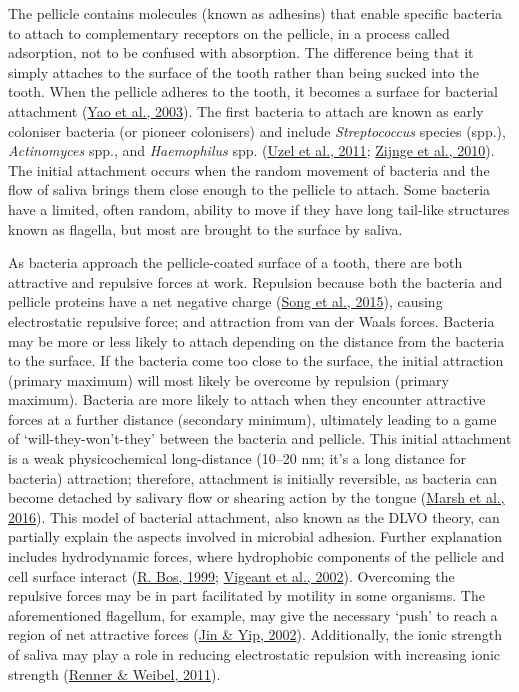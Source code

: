 \documentclass[
  letterpaper,
]{book}
\begin{document}
The pellicle contains molecules (known as adhesins) that enable specific
bacteria to attach to complementary receptors on the pellicle, in a
process called adsorption, not to be confused with absorption. The
difference being that it simply attaches to the surface of the tooth
rather than being sucked into the tooth. When the pellicle adheres to
the tooth, it becomes a surface for bacterial attachment
(\protect\hyperlink{ref-yaoIdentificationProtein2003}{Yao et al.,
2003}). The first bacteria to attach are known as early coloniser
bacteria (or pioneer colonisers) and include \emph{Streptococcus}
species (spp.), \emph{Actinomyces} spp., and \emph{Haemophilus} spp.
(\protect\hyperlink{ref-uzelMicrobialShifts2011}{Uzel et al., 2011};
\protect\hyperlink{ref-zijngeBiofilmArchitecture2010}{Zijnge et al.,
2010}). The initial attachment occurs when the random movement of
bacteria and the flow of saliva brings them close enough to the pellicle
to attach. Some bacteria have a limited, often random, ability to move
if they have long tail-like structures known as flagella, but most are
brought to the surface by saliva.

As bacteria approach the pellicle-coated surface of a tooth, there are
both attractive and repulsive forces at work. Repulsion because both the
bacteria and pellicle proteins have a net negative charge
(\protect\hyperlink{ref-songEffectsMaterial2015}{Song et al., 2015}),
causing electrostatic repulsive force; and attraction from van der Waals
forces. Bacteria may be more or less likely to attach depending on the
distance from the bacteria to the surface. If the bacteria come too
close to the surface, the initial attraction (primary maximum) will most
likely be overcome by repulsion (primary maximum). Bacteria are more
likely to attach when they encounter attractive forces at a further
distance (secondary minimum), ultimately leading to a game of
`will-they-won't-they' between the bacteria and pellicle. This initial
attachment is a weak physicochemical long-distance (10--20 nm; it's a
long distance for bacteria) attraction; therefore, attachment is
initially reversible, as bacteria can become detached by salivary flow
or shearing action by the tongue
(\protect\hyperlink{ref-marshDentalPlaque2016}{Marsh et al., 2016}).
This model of bacterial attachment, also known as the DLVO theory, can
partially explain the aspects involved in microbial adhesion. Further
explanation includes hydrodynamic forces, where hydrophobic components
of the pellicle and cell surface interact
(\protect\hyperlink{ref-bosPhysicochemistryInitial1999}{R. Bos, 1999};
\protect\hyperlink{ref-vigeantReversibleIrreversible2002}{Vigeant et
al., 2002}). Overcoming the repulsive forces may be in part facilitated
by motility in some organisms. The aforementioned flagellum, for
example, may give the necessary `push' to reach a region of net
attractive forces
(\protect\hyperlink{ref-jinSupragingivalCalculus2002}{Jin \& Yip,
2002}). Additionally, the ionic strength of saliva may play a role in
reducing electrostatic repulsion with increasing ionic strength
(\protect\hyperlink{ref-rennerPhysicochemicalRegulation2011}{Renner \&
Weibel, 2011}).
\end{document}

